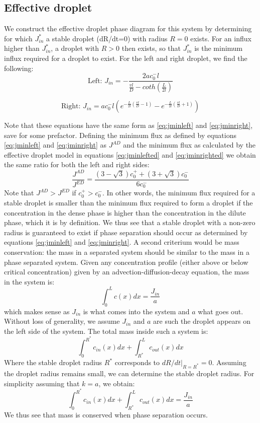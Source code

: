 \documentclass{Dissertate}
\begin{document}
\hypertarget{effective-droplet-2}{%
\subsection{Effective droplet}\label{effective-droplet-2}}

We construct the effective droplet phase diagram for this system by
determining for which \(J^{*}_{in}\) a stable droplet (dR/dt=0) with
radius \(R=0\) exists. For an influx higher than \(J_{in}^*\), a droplet
with \(R>0\) then exists, so that \(J_{in}^*\) is the minimum influx
required for a droplet to exist. For the left and right droplet, we find
the following: \begin{equation}
\text{Left:  }J_{in} = - \frac{ 2a c_0^-l}{\frac{vl}{D}-coth(\frac{L}{2l})}
\label{eq:jminlefted}\end{equation}

\begin{equation}
\text{Right: } J_{in} =ac_0^-l\left(e^{-\frac{L}{2l}(\frac{vl}{D}-1)}-e^{-\frac{L}{2l}(\frac{vl}{D}+1)}\right)
\label{eq:jminrighted}\end{equation}

Note that these equations have the same form as \ref{eq:jminleft}
and \ref{eq:jminright}, save for some prefactor. Defining the
minimum flux as defined by equations \ref{eq:jminleft} and
\ref{eq:jminright} as \(J^{AD}\) and the minimum flux as calculated
by the effective droplet model in equations \ref{eq:jminlefted} and
\ref{eq:jminrighted} we obtain the same ratio for both the left and
right sides: \[
\frac{J^{AD}}{J^{ED}} = \frac{(3-\sqrt{3})c_0^++(3+\sqrt{3})c_0^-}{6c_0^-}
\] Note that \(J^{AD}>J^{ED}\) if \(c_0^+>c_0^-\). In other words, the
minimum flux required for a stable droplet is smaller than the minimum
flux required to form a droplet if the concentration in the dense phase
is higher than the concentration in the dilute phase, which it is by
definition. We thus see that a stable droplet with a non-zero radius is
guaranteed to exist if phase separation should occur as determined by
equations \ref{eq:jminleft} and \ref{eq:jminright}. A second
criterium would be mass conservation: the mass in a separated system
should be similar to the mass in a phase separated system. Given any
concentration profile (either above or below critical concentration)
given by an advection-diffusion-decay equation, the mass in the system
is: \[
\int_0^L c(x)dx = \frac{J_{in}}{a}
\] which makes sense as \(J_{in}\) is what comes into the system and
\(a\) what goes out. Without loss of generality, we assume \(J_{in}\)
and \(a\) are such the droplet appears on the left side of the system.
The total mass inside such a system is: \[
\int_0^{R^*}c_{in}(x)dx + \int_{R^*}^Lc_{out}(x)dx
\] Where the stable droplet radius \(R^*\) corresponds to
\(dR/dt|_{R=R^*}=0\). Assuming the droplet radius remains small, we can
determine the stable droplet radius. For simplicity assuming that
\(k=a\), we obtain: \[
\int_0^{R^*}c_{in}(x)dx + \int_{R^*}^Lc_{out}(x)dx=\frac{J_{in}}{a}
\] We thus see that mass is conserved when phase separation occurs.
\end{document}
